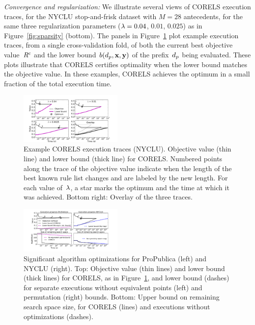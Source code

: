 \textit{Convergence and regularization:}
We illustrate several views of CORELS execution traces,
for the NYCLU stop-and-frisk dataset with ${M = 28}$ antecedents,
for the same three regularization parameters (${{\lambda} = 0.04}$, $0.01$, $0.025$)
as in Figure~\ref{fig:sparsity} (bottom).
%
The panels in Figure~\ref{fig:weapon-reg-execution} plot example execution traces,
from a single cross-validation fold, of both the current best objective value~${R^c}$
and the lower bound~$b(d_p, \mathbf{x}, \mathbf{y})$ of the prefix~$d_p$ being evaluated.
%
These plots illustrate that CORELS certifies optimality
when the lower bound matches the objective value.
%
In these examples, CORELS achieves the optimum in a small fraction of the total execution time.

\begin{figure}[t!]
\begin{center}
\includegraphics[trim={25mm 10mm 35mm 10mm},
width=0.45\textwidth]{figs/weapon_reg_small-execution.pdf}
\end{center}
\caption{Example CORELS execution traces (NYCLU).
%
Objective value (thin line) and lower bound (thick line) for CORELS.
%
Numbered points along the trace of the objective value
indicate when the length of the best known rule list changes
and are labeled by the new length.
%
For each value of~${\lambda}$, a star marks the optimum
and the time at which it was achieved.
%
Bottom right: Overlay of the three traces.
}
\label{fig:weapon-reg-execution}
\end{figure}

\begin{figure}[t!]
\begin{center}
\includegraphics[trim={30mm 15mm 35mm 5mm}, width=0.45\textwidth]{figs/weapon_execution-remaining-space.pdf}
\end{center}
\vspace{-2mm}
\caption{Significant algorithm optimizations
for ProPublica (left) and NYCLU (right).
%
Top: Objective value (thin lines) and lower bound (thick lines) for CORELS,
as in Figure~\ref{fig:weapon-reg-execution},
and lower bound (dashes) for separate executions without
equivalent points (left) and permutation (right) bounds.
%
Bottom: Upper bound on remaining search space size,
for CORELS (lines) and executions without optimizations (dashes).
}
\label{fig:objective}
\end{figure}

